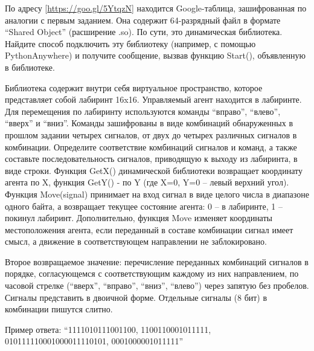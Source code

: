 
По адресу [\url{https://goo.gl/5YtqzN}] находится Google-таблица, зашифрованная по 
аналогии с первым заданием. Она содержит 64-разрядный файл в формате “Shared Object” (расширение .so). 
По сути, это динамическая библиотека. Найдите способ подключить эту библиотеку (например, с помощью 
PythonAnywhere) и получите сообщение, вызвав функцию Start(), объявленную в библиотеке.

Библиотека содержит внутри себя виртуальное пространство, которое представляет собой лабиринт 16x16. 
Управляемый агент находится в лабиринте. Для перемещения по лабиринту используются команды “вправо”, 
“влево”, “вверх” и “вниз”. Команды зашифрованы в виде комбинаций обнаруженных в прошлом задании четырех 
сигналов, от двух до четырех различных сигналов в комбинации. Определите соответствие комбинаций сигналов 
и команд, а также составьте последовательность сигналов, приводящую к выходу из лабиринта, в виде строки.
 Функция GetX() динамической библиотеки возвращает координату агента по X, функция GetY() - по Y (где {X=0, Y=0} – левый верхний угол). Функция Move(signal) принимает на вход сигнал в виде целого числа в диапазоне одного байта, а возвращает текущее состояние агента: 0 – в лабиринте, 1 – покинул лабиринт. Дополнительно, функция Move изменяет координаты местоположения агента, если переданный в составе комбинации сигнал имеет смысл, а движение в соответствующем направлении не заблокировано.

Второе возвращаемое значение: перечисление переданных комбинаций сигналов в порядке, согласующемся с соответствующим каждому из них направлением, по часовой стрелке (“вверх”, “вправо”, “вниз”, “влево”) через запятую без пробелов. Сигналы представить в двоичной форме. Отдельные сигналы (8 бит) в комбинации пишутся слитно.

Пример ответа: “1111010111001100, 1100110001011111, 010111110001000011110101, 0001000001011111”

